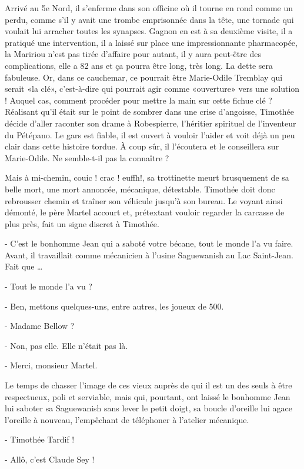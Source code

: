 Arrivé au 5e Nord, il s’enferme dans son officine où il tourne en rond comme un perdu, comme s’il y avait une trombe emprisonnée dans la tête, une tornade qui voulait lui arracher toutes les synapses. Gagnon en est à sa deuxième visite, il a pratiqué une intervention, il a laissé sur place une impressionnante pharmacopée, la Maririou n’est pas tirée d’affaire pour autant, il y aura peut-être des complications, elle a 82 ans et ça pourra être long, très long. La dette sera fabuleuse. Or, dans ce cauchemar, ce pourrait être Marie-Odile Tremblay qui serait «la clé», c’est-à-dire qui pourrait agir comme «ouverture» vers une solution ! Auquel cas, comment procéder pour mettre la main sur cette fichue clé ? Réalisant qu’il était sur le point de sombrer dans une crise d’angoisse, Timothée décide d’aller raconter son drame à Robespierre, l’héritier spirituel de l’inventeur du Pétépano. Le gars est fiable, il est ouvert à vouloir l’aider et voit déjà un peu clair dans cette histoire tordue. À coup sûr, il l’écoutera et le conseillera sur Marie-Odile. Ne semble-t-il pas la connaître ?

Mais à mi-chemin, couic ! crac ! euffh!, sa trottinette meurt brusquement de sa belle mort, une mort annoncée, mécanique, détestable. Timothée doit donc rebrousser chemin et traîner son véhicule jusqu’à son bureau. Le voyant ainsi démonté, le père Martel accourt et, prétextant vouloir regarder la carcasse de plus près, fait un signe discret à Timothée.

- C’est le bonhomme Jean qui a saboté votre bécane, tout le monde l’a vu faire. Avant, il travaillait comme mécanicien à l’usine Saguewanish au Lac Saint-Jean. Fait que …

- Tout le monde l’a vu ?

- Ben, mettons quelques-uns, entre autres, les joueux de 500.

- Madame Bellow ?

- Non, pas elle. Elle n’était pas là.

- Merci, monsieur Martel.

Le temps de chasser l’image de ces vieux auprès de qui il est un des seuls à être respectueux, poli et serviable, mais qui, pourtant, ont laissé le bonhomme Jean lui saboter sa Saguewanish sans lever le petit doigt, sa boucle d’oreille lui agace l’oreille à nouveau, l’empêchant de téléphoner à l’atelier mécanique.

- Timothée Tardif !

- Allô, c’est Claude Sey !

